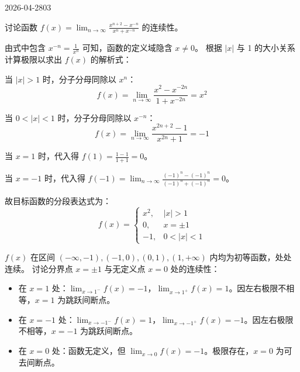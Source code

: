 \begin{mistake}{2026-04-28}{03}

\begin{problemcontent}
讨论函数 \(f(x) = \lim_{n \to \infty} \frac{x^{n+2} - x^{-n}}{x^n + x^{-n}}\) 的连续性。
\end{problemcontent}

\begin{solutioncontent}
由式中包含 \(x^{-n} = \frac{1}{x^n}\) 可知，函数的定义域隐含 \(x \neq 0\)。
根据 \(|x|\) 与 1 的大小关系计算极限以求出 \(f(x)\) 的解析式：

当 \(|x| > 1\) 时，分子分母同除以 \(x^n\)：
\[ f(x) = \lim_{n \to \infty} \frac{x^2 - x^{-2n}}{1 + x^{-2n}} = x^2 \]

当 \(0 < |x| < 1\) 时，分子分母同除以 \(x^{-n}\)：
\[ f(x) = \lim_{n \to \infty} \frac{x^{2n+2} - 1}{x^{2n} + 1} = -1 \]

当 \(x = 1\) 时，代入得 \(f(1) = \frac{1-1}{1+1} = 0\)。

当 \(x = -1\) 时，代入得 \(f(-1) = \lim_{n \to \infty} \frac{(-1)^n - (-1)^n}{(-1)^n + (-1)^n} = 0\)。

故目标函数的分段表达式为：
\[
 f(x) = \begin{cases} x^2, & |x| > 1 \\ 0, & x = \pm 1 \\ -1, & 0 < |x| < 1 \end{cases}
\]

\(f(x)\) 在区间 \(( -\infty, -1), (-1, 0), (0, 1), (1, +\infty)\) 内均为初等函数，处处连续。
讨论分界点 \(x=\pm 1\) 与无定义点 \(x=0\) 处的连续性：
\begin{itemize}
 \item 在 \(x = 1\) 处：\(\lim_{x \to 1^-} f(x) = -1\)，\(\lim_{x \to 1^+} f(x) = 1\)。因左右极限不相等，\(x=1\) 为跳跃间断点。
 \item 在 \(x = -1\) 处：\(\lim_{x \to -1^-} f(x) = 1\)，\(\lim_{x \to -1^+} f(x) = -1\)。因左右极限不相等，\(x=-1\) 为跳跃间断点。
 \item 在 \(x = 0\) 处：函数无定义，但 \(\lim_{x \to 0} f(x) = -1\)。极限存在，\(x=0\) 为可去间断点。
\end{itemize}
\end{solutioncontent}


\end{mistake}
